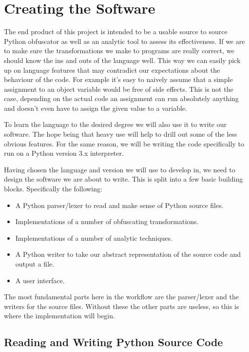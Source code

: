 \documentclass{report}
\begin{document}
\section{Creating the Software}

The end product of this project is intended to be a usable source to source Python obfuscator as well as an analytic tool
to assess its effectiveness. If we are to make sure the transformations we make to programs are really correct, we should
know the ins and outs of the language well. This way we can easily pick up on language features that may contradict our
expectations about the behaviour of the code. For example it's easy to naively assume that a simple assignment to an object
variable would be free of side effects. This is not the case, depending on the actual code an assignment can run absolutely
anything \cite{pyprop} and doesn't even have to assign the given value to a variable.

To learn the language to the desired degree we will also use it to write our software. The hope being that heavy use will help to
drill out some of the less obvious features. For the same reason, we will be writing the code specifically to run on a Python version 3.x
interpreter.

Having chosen the language and version we will use to develop in, we need to design the software we are about to write. This is split into a few basic building
blocks. Specifically the following:

\begin{itemize}
\item A Python parser/lexer to read and make sense of Python source files.
\item Implementations of a number of obfuscating transformations.
\item Implementations of a number of analytic techniques.
\item A Python writer to take our abstract representation of the source code and output a file.
\item A user interface.
\end{itemize}

The most fundamental parts here in the workflow are the parser/lexer and the writers for the source files.
Without these the other parts are useless, so this is where the implementation will begin.

\subsection{Reading and Writing Python Source Code}
\end{document}
